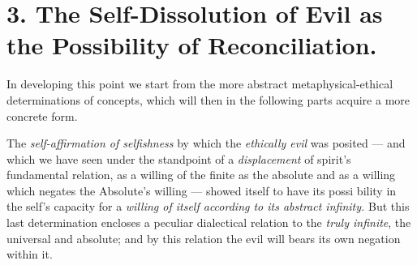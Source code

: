 \documentclass[12pt,a4paper]{book}
\begin{document}
\section*{3. The Self-Dissolution of Evil as the Possibility of Reconciliation.}

In developing this point we start from the more abstract metaphysical-ethical
determinations of concepts, which will then in the following parts acquire a
more concrete form.

The \emph{self-affirmation of selfishness} by which the \emph{ethically evil}
was posited --- and which we have seen under the standpoint of a
\emph{displacement} of spirit's fundamental relation, as a willing of the finite
as the absolute and as a willing which negates the Absolute's willing --- showed
itself to have its possi\-%
\setcounter{footnote}{0}%
bility in the self's capacity for a \emph{willing of itself according to its
abstract infinity.} But this last determination encloses a peculiar dialectical
relation to the \emph{truly infinite}, the universal and absolute; and by this
relation the evil will bears its own negation within it.
\end{document}

